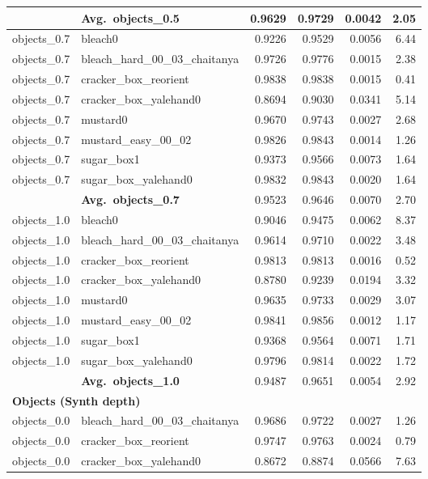 \begin{longtable}{llrrrr}
  & \textbf{Avg.~objects_0.5} & 0.9629 & 0.9729 & 0.0042 & 2.05 \\
  \midrule
  objects_0.7 & bleach0 & 0.9226 & 0.9529 & 0.0056 & 6.44 \\
  objects_0.7 & bleach\_hard\_00\_03\_chaitanya & 0.9726 & 0.9776 & 0.0015 & 2.38 \\
  objects_0.7 & cracker\_box\_reorient & 0.9838 & 0.9838 & 0.0015 & 0.41 \\
  objects_0.7 & cracker\_box\_yalehand0 & 0.8694 & 0.9030 & 0.0341 & 5.14 \\
  objects_0.7 & mustard0 & 0.9670 & 0.9743 & 0.0027 & 2.68 \\
  objects_0.7 & mustard\_easy\_00\_02 & 0.9826 & 0.9843 & 0.0014 & 1.26 \\
  objects_0.7 & sugar\_box1 & 0.9373 & 0.9566 & 0.0073 & 1.64 \\
  objects_0.7 & sugar\_box\_yalehand0 & 0.9832 & 0.9843 & 0.0020 & 1.64 \\
  \cmidrule{2-6}
  & \textbf{Avg.~objects_0.7} & 0.9523 & 0.9646 & 0.0070 & 2.70 \\
  \midrule
  objects_1.0 & bleach0 & 0.9046 & 0.9475 & 0.0062 & 8.37 \\
  objects_1.0 & bleach\_hard\_00\_03\_chaitanya & 0.9614 & 0.9710 & 0.0022 & 3.48 \\
  objects_1.0 & cracker\_box\_reorient & 0.9813 & 0.9813 & 0.0016 & 0.52 \\
  objects_1.0 & cracker\_box\_yalehand0 & 0.8780 & 0.9239 & 0.0194 & 3.32 \\
  objects_1.0 & mustard0 & 0.9635 & 0.9733 & 0.0029 & 3.07 \\
  objects_1.0 & mustard\_easy\_00\_02 & 0.9841 & 0.9856 & 0.0012 & 1.17 \\
  objects_1.0 & sugar\_box1 & 0.9368 & 0.9564 & 0.0071 & 1.71 \\
  objects_1.0 & sugar\_box\_yalehand0 & 0.9796 & 0.9814 & 0.0022 & 1.72 \\
  \cmidrule{2-6}
  & \textbf{Avg.~objects_1.0} & 0.9487 & 0.9651 & 0.0054 & 2.92 \\
  \midrule
\multicolumn{6}{l}{\textbf{Objects (Synth depth)}} \\
\midrule
  objects_0.0 & bleach\_hard\_00\_03\_chaitanya & 0.9686 & 0.9722 & 0.0027 & 1.26 \\
  objects_0.0 & cracker\_box\_reorient & 0.9747 & 0.9763 & 0.0024 & 0.79 \\
  objects_0.0 & cracker\_box\_yalehand0 & 0.8672 & 0.8874 & 0.0566 & 7.63 \\

\end{longtable}
